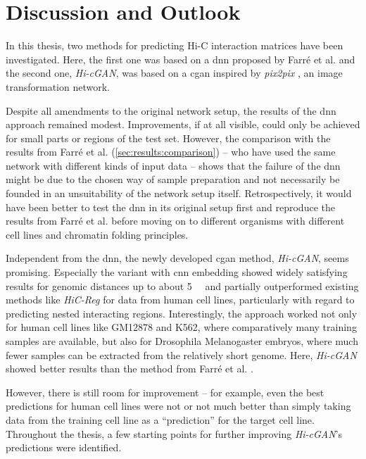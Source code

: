 \section{Discussion and Outlook}
In this thesis, two methods for predicting Hi-C interaction matrices have been investigated.
Here, the first one was based on a \acrlong{dnn} proposed by Farr\'e et al. \cite{Farre2018a} and the second one, \emph{Hi-cGAN}, 
was based on a \acrlong{cgan} inspired by \emph{pix2pix} \cite{Isola2017}, an image transformation network.

Despite all amendments to the original network setup,
the results of the \acrlong{dnn} approach remained modest.
Improvements, if at all visible, could only be achieved for small parts or regions of the test set.
However, the comparison with the results from Farr\'e et al. \cite{Farre2018a} (\cref{sec:results:comparison}) -- who have used the same network with different kinds of input data --
shows that the failure of the \acrshort{dnn} might be due to the chosen way of sample preparation 
and not necessarily be founded in an unsuitability of the network setup itself.
Retrospectively, it would have been better to test the \acrshort{dnn} in its original setup first and reproduce the results from Farr\'e et al. \cite{Farre2018a} 
before moving on to different organisms with different cell lines and chromatin folding principles.

Independent from the \acrshort{dnn}, the newly developed \acrlong{cgan} method, \emph{Hi-cGAN}, seems promising.
Especially the variant with \acrshort{cnn} embedding showed widely satisfying results for genomic distances up to about \SI{5}{\mega\bp}
and partially outperformed existing methods like \emph{HiC-Reg} \cite{Zhang2019} for data from human cell lines, 
particularly with regard to predicting nested interacting regions.
Interestingly, the approach worked not only for human cell lines like GM12878 and K562, where comparatively many training samples are available,
but also for Drosophila Melanogaster embryos, where much fewer samples can be extracted from the relatively short genome.
Here, \emph{Hi-cGAN} showed better results than the method from Farr\'e et al. \cite{Farre2018a}.

However, there is still room for improvement -- for example, even the best predictions for human cell lines were not or not much better 
than simply taking data from the training cell line as a ``prediction'' for the target cell line.
Throughout the thesis, a few starting points for further improving \emph{Hi-cGAN}'s predictions were identified.

